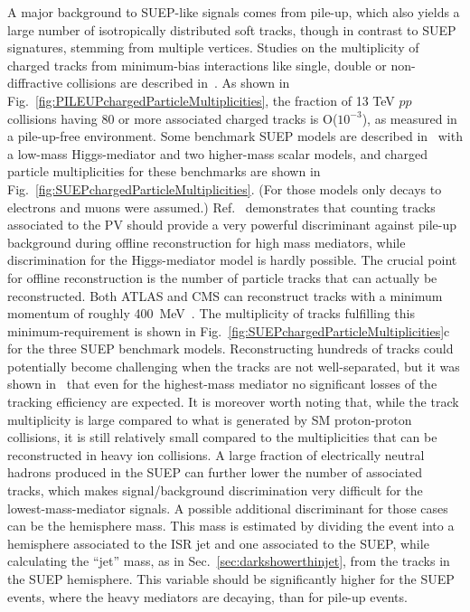 A major background to SUEP-like signals comes from pile-up, which also yields a large number of isotropically distributed soft tracks, though in contrast to SUEP signatures, stemming from multiple vertices. Studies on the multiplicity of charged tracks from minimum-bias interactions like single, double or non-diffractive collisions are described in~\cite{Aad:2016mok}. As shown in Fig.~\ref{fig:PILEUPchargedParticleMultiplicities}, the fraction of  13 TeV $pp$ collisions having 80 or more associated charged tracks is O($10^{-3}$), as measured in a pile-up-free environment.  Some benchmark SUEP models are described in~\cite{Knapen:2016hky} with a low-mass Higgs-mediator and two higher-mass scalar models, and charged particle multiplicities for these benchmarks are shown in Fig.~\ref{fig:SUEPchargedParticleMultiplicities}. (For those models only decays to electrons and muons were assumed.) Ref.~\cite{Knapen:2016hky} demonstrates that counting tracks associated to the PV should provide a very powerful discriminant against pile-up background during offline reconstruction for high mass mediators, while discrimination for the Higgs-mediator model is hardly possible. The crucial point for offline reconstruction is the number of particle tracks that can actually be reconstructed. Both ATLAS and CMS can reconstruct tracks with a minimum momentum of roughly 400~MeV~\cite{Sirunyan:2017ulk}. The multiplicity of tracks fulfilling this minimum-\pt requirement is shown in Fig.~\ref{fig:SUEPchargedParticleMultiplicities}c for the three SUEP benchmark models. Reconstructing hundreds of tracks could potentially become challenging when the tracks are not well-separated, but it was shown in~\cite{Knapen:2016hky} that even for the highest-mass mediator no significant losses of the tracking efficiency are expected. It is moreover worth noting that, while the track multiplicity is large compared to what is generated by SM proton-proton collisions, it is still relatively small compared to the multiplicities that can be reconstructed in heavy ion collisions. A large fraction of electrically neutral hadrons produced in the SUEP can further lower the number of associated tracks, which makes signal/background discrimination very difficult for the lowest-mass-mediator signals. A possible additional discriminant for those cases can be the hemisphere mass. This mass is estimated by dividing the event into a hemisphere associated to the ISR jet and one associated to the SUEP, while calculating the ``jet'' mass, as in Sec.~\ref{sec:darkshowerthinjet}, from the tracks in the SUEP hemisphere. This variable should be significantly higher for the SUEP events, where the heavy mediators are decaying, than for pile-up events.

